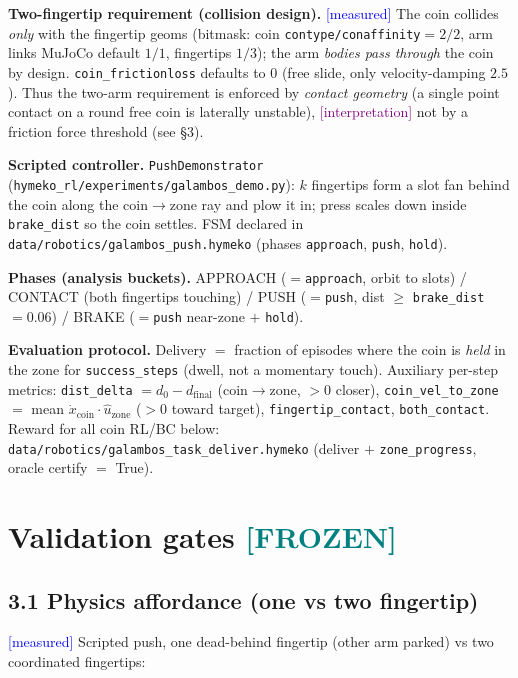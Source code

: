 \documentclass[11pt]{article}
\newcommand{\meas}{\textcolor{blue}{[measured]}}
\newcommand{\interp}{\textcolor{purple}{[interpretation]}}
\newcommand{\frozen}{\textcolor{teal}{\textbf{[FROZEN]}}}
\newcommand{\fn}[1]{\texttt{#1}}
\begin{document}
\textbf{Two-fingertip requirement (collision design).} \meas{} The coin collides \emph{only} with the fingertip
geoms (bitmask: coin \fn{contype/conaffinity}$=2/2$, arm links MuJoCo default $1/1$, fingertips $1/3$); the arm
\emph{bodies pass through} the coin by design. \fn{coin\_frictionloss} defaults to $0$ (free slide, only
velocity-damping $2.5$). Thus the two-arm requirement is enforced by \emph{contact geometry} (a single point
contact on a round free coin is laterally unstable), \interp{} not by a friction force threshold (see \S3).

\textbf{Scripted controller.} \fn{PushDemonstrator} (\fn{hymeko\_rl/experiments/galambos\_demo.py}): $k$ fingertips
form a slot fan behind the coin along the coin$\to$zone ray and plow it in; press scales down inside
\fn{brake\_dist} so the coin settles. FSM declared in \fn{data/robotics/galambos\_push.hymeko} (phases
\fn{approach}, \fn{push}, \fn{hold}).

\textbf{Phases (analysis buckets).} APPROACH ($=$\fn{approach}, orbit to slots) / CONTACT (both fingertips
touching) / PUSH ($=$\fn{push}, dist $\ge$ \fn{brake\_dist}$=0.06$) / BRAKE ($=$\fn{push} near-zone $+$ \fn{hold}).

\textbf{Evaluation protocol.} Delivery $=$ fraction of episodes where the coin is \emph{held} in the zone for
\fn{success\_steps} (dwell, not a momentary touch). Auxiliary per-step metrics: \fn{dist\_delta} $=d_0-d_{\text{final}}$
(coin$\to$zone, $>0$ closer), \fn{coin\_vel\_to\_zone} $=\mathbb{}$ mean $\dot{x}_{\text{coin}}\cdot\hat{u}_{\text{zone}}$
($>0$ toward target), \fn{fingertip\_contact}, \fn{both\_contact}. Reward for all coin RL/BC below:
\fn{data/robotics/galambos\_task\_deliver.hymeko} (deliver $+$ \fn{zone\_progress}, oracle certify $=$ True).

\section{Validation gates \frozen}
\subsection*{3.1 Physics affordance (one vs two fingertip)}
\meas{} Scripted push, one dead-behind fingertip (other arm parked) vs two coordinated fingertips:
\end{document}
